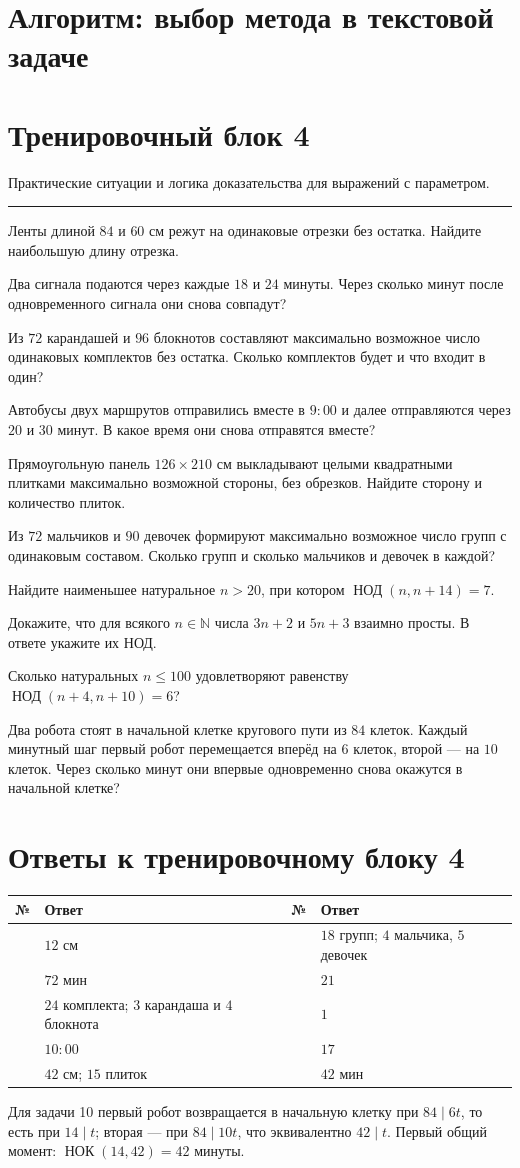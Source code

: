 \documentclass[11pt,a4paper]{article}
\newcommand{\gcdru}[2]{\mathop{\text{НОД}}\nolimits(#1,#2)}
\newcommand{\lcmru}[2]{\mathop{\text{НОК}}\nolimits(#1,#2)}
\newcommand{\selfcheck}[1]{\par\needspace{3\baselineskip}{\color{muted}\bfseries Проверка себя.} #1\par}
\newcommand{\task}[2]{\par\needspace{2\baselineskip}\noindent\makebox[8mm][l]{\color{navy}\bfseries #1.}#2\par\vspace{2mm}}
\newcommand{\training}[2]{\clearpage\section*{Тренировочный блок #1}\textcolor{muted}{#2}\par\vspace{3mm}\rule{\linewidth}{.4pt}\vspace{2mm}}
\newcommand{\answers}[2]{\clearpage\section*{Ответы к тренировочному блоку #1}\vspace{3mm}#2}
\newcommand{\anstable}[1]{\begin{center}\small\begin{tabularx}{\linewidth}{>{\centering\arraybackslash}p{9mm}X>{\centering\arraybackslash}p{9mm}X}\toprule\textbf{№}&\textbf{Ответ}&\textbf{№}&\textbf{Ответ}\\\midrule #1\\\bottomrule\end{tabularx}\end{center}}
\newcommand{\schemetitle}[1]{\clearpage\section*{Алгоритм: #1}\vspace{10mm}}
\begin{document}
\schemetitle{выбор метода в текстовой задаче}
\begin{center}
\end{center}
\training{4}{Практические ситуации и логика доказательства для выражений с параметром.}
\task{1}{Ленты длиной $84$ и $60$ см режут на одинаковые отрезки без остатка. Найдите наибольшую длину отрезка.}
\task{2}{Два сигнала подаются через каждые $18$ и $24$ минуты. Через сколько минут после одновременного сигнала они снова совпадут?}
\task{3}{Из $72$ карандашей и $96$ блокнотов составляют максимально возможное число одинаковых комплектов без остатка. Сколько комплектов будет и что входит в один?}
\task{4}{Автобусы двух маршрутов отправились вместе в $9{:}00$ и далее отправляются через $20$ и $30$ минут. В какое время они снова отправятся вместе?}
\task{5}{Прямоугольную панель $126\times210$ см выкладывают целыми квадратными плитками максимально возможной стороны, без обрезков. Найдите сторону и количество плиток.}
\task{6}{Из $72$ мальчиков и $90$ девочек формируют максимально возможное число групп с одинаковым составом. Сколько групп и сколько мальчиков и девочек в каждой?}
\task{7}{Найдите наименьшее натуральное $n>20$, при котором $\gcdru{n}{n+14}=7$.}
\task{8}{Докажите, что для всякого $n\in\mathbb N$ числа $3n+2$ и $5n+3$ взаимно просты. В ответе укажите их НОД.}
\task{9}{Сколько натуральных $n\le100$ удовлетворяют равенству $\gcdru{n+4}{n+10}=6$?}
\task{10}{Два робота стоят в начальной клетке кругового пути из $84$ клеток. Каждый минутный шаг первый робот перемещается вперёд на $6$ клеток, второй --- на $10$ клеток. Через сколько минут они впервые одновременно снова окажутся в начальной клетке?}
\answers{4}{\anstable{
1&$12$ см&6&$18$ групп; $4$ мальчика, $5$ девочек\\
2&$72$ мин&7&$21$\\
3&$24$ комплекта; $3$ карандаша и $4$ блокнота&8&$1$\\
4&$10{:}00$&9&$17$\\
5&$42$ см; $15$ плиток&10&$42$ мин
}}
\selfcheck{Для задачи 10 первый робот возвращается в начальную клетку при $84\mid6t$, то есть при $14\mid t$; вторая --- при $84\mid10t$, что эквивалентно $42\mid t$. Первый общий момент: $\lcmru{14}{42}=42$ минуты.}
\end{document}
